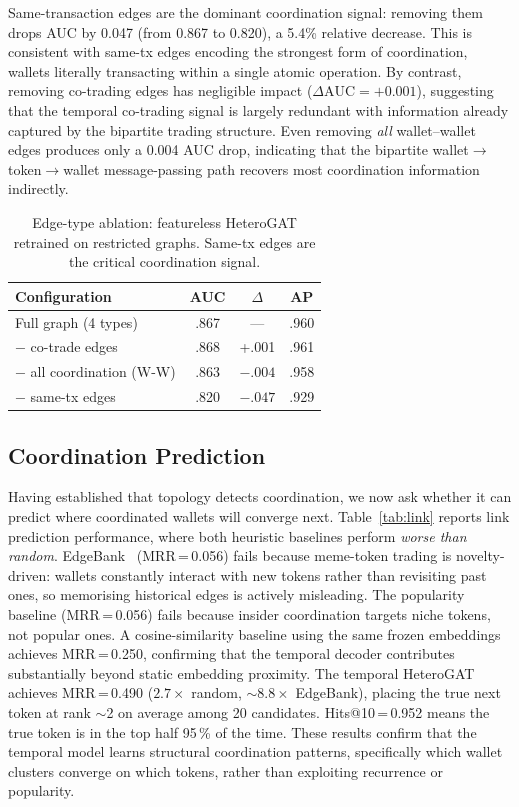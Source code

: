 \documentclass[10pt,journal]{IEEEtran}
\begin{document}
Same-transaction edges are the dominant coordination signal: removing
them drops AUC by 0.047 (from 0.867 to 0.820), a 5.4\% relative
decrease. This is consistent with same-tx edges encoding the strongest
form of coordination, wallets literally transacting within a single
atomic operation. By contrast, removing co-trading edges has negligible
impact ($\Delta\text{AUC}{=}+0.001$), suggesting that the temporal
co-trading signal is largely redundant with information already captured
by the bipartite trading structure. Even removing \emph{all}
wallet--wallet edges produces only a 0.004 AUC drop, indicating
that the bipartite wallet$\to$token$\to$wallet message-passing path
recovers most coordination information indirectly.

\begin{table}[t]
\caption{Edge-type ablation: featureless HeteroGAT retrained on
restricted graphs. Same-tx edges are the critical coordination signal.}
\label{tab:ablation}
\centering\small
\begin{tabular}{lccc}
\toprule
Configuration & AUC & $\Delta$ & AP \\
\midrule
Full graph (4 types)       & .867 & ---     & .960 \\
$-$ co-trade edges         & .868 & +.001   & .961 \\
$-$ all coordination (W-W) & .863 & $-.004$ & .958 \\
$-$ same-tx edges          & .820 & $-.047$ & .929 \\
\bottomrule
\end{tabular}
\end{table}

\subsection{Coordination Prediction}
\label{sec:link_results}

Having established that topology detects coordination, we now ask
whether it can predict where coordinated wallets will converge next.
Table~\ref{tab:link} reports link prediction performance, where both
heuristic baselines perform \emph{worse than random}.
EdgeBank~\cite{poursafaei2022edgebank} (MRR\,=\,0.056) fails because
meme-token trading is novelty-driven: wallets constantly interact with
new tokens rather than revisiting past ones, so memorising historical
edges is actively misleading. The popularity baseline
(MRR\,=\,0.056) fails because insider coordination targets niche
tokens, not popular ones.
A cosine-similarity baseline using the same frozen embeddings achieves
MRR\,=\,0.250, confirming that the temporal decoder contributes
substantially beyond static embedding proximity.
The temporal HeteroGAT achieves
MRR\,=\,0.490 ($2.7\times$ random, ${\sim}8.8\times$ EdgeBank), placing the
true next token at rank ${\sim}$2 on average among 20 candidates.
Hits@10\,=\,0.952 means the true token is in the top half 95\,\% of
the time. These results confirm that the temporal model learns
structural coordination patterns, specifically which wallet clusters
converge on which tokens, rather than exploiting recurrence or
popularity.
\end{document}
